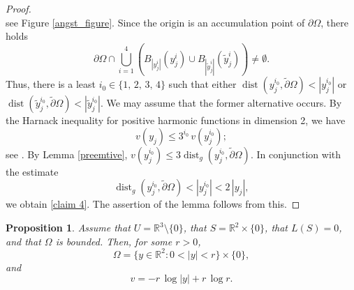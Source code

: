 \documentclass[11pt]{amsart}
\newtheorem{prop}{Proposition}
\begin{document}
\begin{proof}
$$	$$
	see Figure \ref{angst_figure}.
Since the origin is an accumulation point of $\partial \Omega$, there holds
$$
\partial \Omega\cap   \bigcup_{i=1}^4 \left(B_{|y_j^i|}(y_j^i)\cup B_{|\tilde y_j^i|}(\tilde y_j^i)\right)  \neq \emptyset.
$$
 Thus, there is a least $i_0\in\{1,\,2,\,3,\,4\}$ such that either $\operatorname{dist}(y^{i_0}_j,\tilde \partial \Omega)< |y_j^{i_0}|$ or  $\operatorname{dist}(\tilde y^{i_0}_j,\tilde \partial \Omega)< |\tilde y_j^{i_0}|$. We may assume that the former alternative occurs.  By the Harnack inequality for positive harmonic functions in dimension 2, we have 
	$$
	v(y_j)\leq 3^{i_0}\,v(y^{i_0}_j);
	$$
	see \cite[(1)]{SerrinHarnack}.
By Lemma \ref{preemtive}, $v({y^{i_0}_j})\leq 3\operatorname{dist}_g(y^{i_0}_j,\tilde \partial \Omega)$. In conjunction with the estimate
$$
\operatorname{dist}_g(y^{i_0}_j,\tilde \partial \Omega)<|y^{i_0}_j|<2\,|y_j|,
$$
we obtain \eqref{claim 4}. The assertion of the lemma follows from this.
\end{proof}
\begin{prop} \label{angst}
	Assume that $U=\mathbb{R}^3\setminus\{0\}$, that $S=\mathbb{R}^2\times \{0\}$, that $L(S)=0$, and that $\Omega$ is bounded. Then, for some $r>0$, $$\Omega=\{y\in \mathbb{R}^2:0<|y|<r\}\times\{0\},$$ and $$v=-r\,\log|y|+r\,\log r.$$
\end{prop}
\end{document}
